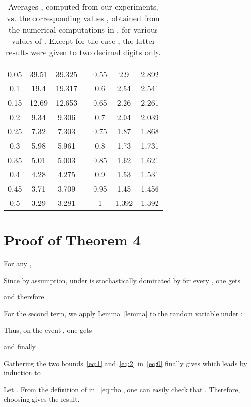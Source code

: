 \documentclass{amsart}
\begin{document}
\begin{table}[!t]
\renewcommand{\arraystretch}{1.3}
\caption{Averages , computed from our
experiments, vs. the corresponding values ,
obtained from the numerical computations in \cite{KipnisR1990}, for various values of .
Except for the case , the latter results were given to
two decimal digits only.} \label{kr_comparison} \centering
\begin{tabular}{|c|c|c|c|c|c|c|}
\cline{1-3} \cline {5-7}
\bfseries  &  & 
& &\bfseries  &  & \\
\cline{1-3} \cline{5-7} 0.05    &   39.51   &   39.325  &   &   0.55
&   2.9   & 2.892   \\  \cline{1-3} \cline{5-7} 0.1     &   19.4
&   19.317  &   &   0.6     &   2.54  & 2.541   \\  \cline{1-3}
\cline{5-7} 0.15    &   12.69   &   12.653  &   &   0.65    &   2.26
& 2.261   \\  \cline{1-3} \cline{5-7} 0.2     &   9.34    &   9.306
&   &   0.7     &   2.04  & 2.039   \\  \cline{1-3} \cline{5-7} 0.25
&   7.32    &   7.303   &   &   0.75    &   1.87  & 1.868   \\
\cline{1-3} \cline{5-7} 0.3     &   5.98    &   5.961   &   &   0.8
&   1.73  & 1.731   \\  \cline{1-3} \cline{5-7} 0.35    &   5.01
&   5.003   &   &   0.85    &   1.62  & 1.621   \\  \cline{1-3}
\cline{5-7} 0.4     &   4.28    &   4.275   &   &   0.9     &   1.53
& 1.531   \\  \cline{1-3} \cline{5-7} 0.45    &   3.71    &   3.709
&   &   0.95    &   1.45  & 1.456   \\  \cline{1-3} \cline{5-7} 0.5
&   3.29    &   3.281   &   &   1       &   1.392  & 1.392   \\
\cline{1-3} \cline{5-7}
\end{tabular}
\end{table}


\section{Proof of Theorem 4}
\label{app:proof}

\noindent
For any ,

Since by assumption,  under  is
stochastically dominated by  for every , one gets

and therefore

For the second term, we apply Lemma~\ref{lemma} to the random
variable  under :

Thus, on the event , one gets

and finally

Gathering the two bounds~\eqref{eq:1} and~\eqref{eq:2}
in~\eqref{eq:0} finally gives
 which leads by induction to

Let .
From the definition of  in ~\eqref{eq:rho}, one
can easily check that . Therefore, choosing
 gives the result.
\end{document}
